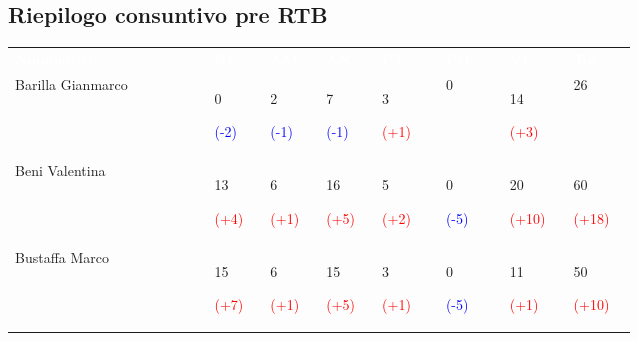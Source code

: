 \subsection{Riepilogo consuntivo pre RTB}
{\renewcommand{\arraystretch}{2.0}        
        \begin{tabular}{P{0.25\linewidth}P{0.07\linewidth}P{0.07\linewidth}P{0.07\linewidth}P{0.08\linewidth}P{0.08\linewidth}P{0.08\linewidth}P{0.08\linewidth}}
            \textcolor{white}{\textbf{Nominativo}} & \textcolor{white}{\textbf{RE}} &
            \textcolor{white}{\textbf{AM}} & \textcolor{white}{\textbf{AN}} &
            \textcolor{white}{\textbf{PT}} & \textcolor{white}{\textbf{PG}} &
            \textcolor{white}{\textbf{VE}} & \textcolor{white}{\textbf{Tot.}}\\
        
            Barilla Gianmarco & 
            0 \par \textcolor{blue}{(-2)} & 
            2 \par \textcolor{blue}{(-1)} & 
            7 \par \textcolor{blue}{(-1)} & 
            3 \par \textcolor{red}{(+1)} & 
            0 & 
            14 \par \textcolor{red}{(+3)} &
            26 \\
            
            Beni Valentina & 
            13 \par \textcolor{red}{(+4)} & 
            6 \par \textcolor{red}{(+1)} & 
            16 \par \textcolor{red}{(+5)} & 
            5 \par \textcolor{red}{(+2)} &
            0 \par \textcolor{blue}{(-5)}&
            20 \par \textcolor{red}{(+10)}& 
            60 \par \textcolor{red}{(+18)}\\

            Bustaffa Marco & 
            15 \par \textcolor{red}{(+7)}& 
            6 \par \textcolor{red}{(+1)} &      
            15 \par \textcolor{red}{(+5)} & 
            3 \par \textcolor{red}{(+1)} &
            0 \par \textcolor{blue}{(-5)} &
            11 \par \textcolor{red}{(+1)}&
            50 \par \textcolor{red}{(+10)}\\


\end{tabular}}
